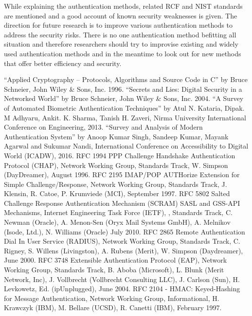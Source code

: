 \begin{multicols}{2}
While explaining the authentication methods, related RCF and NIST standards are mentioned and a good account of known security weaknesses is given. The direction for future research is to improve various authentication methods to address the security risks. There is no one authentication method befitting all situation and therefore researchers should try to improvise existing and widely used authentication methods and in the meantime to look out for new methods that offer better efficiency and security.
\begin{thebibliography}{99}
 ``Applied Cryptography -- Protocols, Algorithms and Source Code in C'' by Bruce Schneier, John Wiley \& Sons, Inc. 1996.
 ``Secrets and Lies: Digital Security in a Networked World'' by Bruce Schneier, John Wiley \& Sons, Inc. 2004.
 ``A Survey of Automated Biometric Authentication Techniques'' by Atul N. Kataria, Dipak. M Adhyaru, Ankit. K. Sharma, Tanish H. Zaveri, Nirma University International Conference on Engineering, 2013.
 ``Survey and Analysis of Modern Authentication System'' by Anoop Kumar Singh, Sandeep Kumar, Mayank Agarwal and Sukumar Nandi,  International Conference on Accessibility to Digital World (ICADW), 2016.
 RFC 1994 PPP Challenge Handshake Authentication Protocol (CHAP), Network Working Group, Standards Track, W. Simpson (DayDreamer), August 1996.
 RFC 2195 IMAP/POP AUTHorize Extension for Simple Challenge/Response, Network Working Group, Standards Track, J. Klensin, R. Catoe, P. Krumviede (MCI), September 1997.
 RFC 5802 Salted Challenge Response Authentication Mechanism (SCRAM) SASL and GSS-API Mechanisms, Internet Engineering Task Force (IETF), , Standards Track, C. Newman (Oracle), A. Menon-Sen (Oryx Mail Systems GmbH), A. Melnikov (Isode, Ltd.), N. Williams (Oracle) July 2010.
 RFC 2865 Remote Authentication Dial In User Service (RADIUS), Network Working Group, Standards Track, C. Rigney, S. Willens (Livingston), A. Rubens (Merit), W. Simpson (Daydreamer), June 2000.
 RFC 3748 Extensible Authentication Protocol (EAP), Network Working Group, Standards Track, B. Aboba (Microsoft), L. Blunk (Merit Network, Inc), J. Vollbrecht (Vollbrecht Consulting LLC), J. Carlson (Sun), H. Levkowetz, Ed. (ipUnplugged), June 2004.
 RFC 2104 - HMAC: Keyed-Hashing for Message Authentication, Network Working Group, Informational, H. Krawczyk (IBM), M. Bellare (UCSD), R. Canetti (IBM), February 1997.

\end{thebibliography}
\end{multicols}
